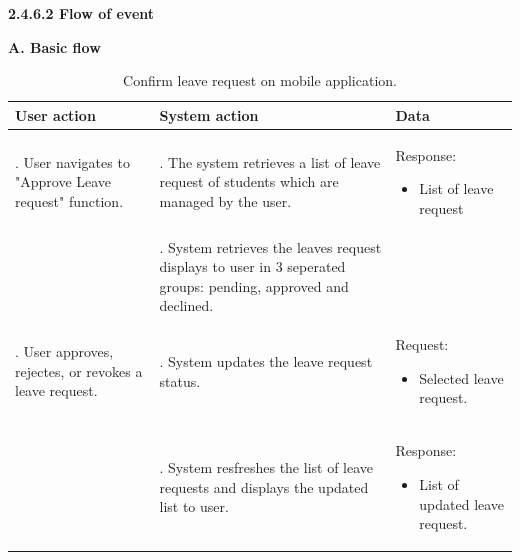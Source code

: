 \vspace{0.5em}
\indent\textbf{2.4.6.2 Flow of event}
\vspace{0.5em}
\par\indent\indent\textbf{A. Basic flow}
\vspace{-0.5em}
\renewcommand{\arraystretch}{1.5}
\begin{longtable}{|>{\raggedright\arraybackslash}p{4.5cm}|
                  >{\raggedright\arraybackslash}p{6cm}|
                  >{\raggedright\arraybackslash}p{4.5cm}|}                  
\caption{Confirm leave request on mobile application.}
\label{tab:leave_request_management_confirm_request_on_mobile_basic_flow}\\
\hline
\centering\textbf{User action} & \centering\textbf{System action} & \centering\arraybackslash\textbf{Data} \\
\hline
\endfirsthead
\endhead

1. User navigates to "Approve Leave request" function. & 2. The system retrieves a list of leave request of students which are managed by the user.&
    \par{Response:
        \vspace{-0.8em}
        \begin{itemize}
            \item List of leave request
            \vspace{-1.5em}
        \end{itemize}
    } \\
\hline
&3. System retrieves the leaves request displays to user in 3 seperated groups: pending, approved and declined.& \\
\hline
4. User approves, rejectes, or revokes a leave request.&5. System updates the leave request status.&
\par{Request: 
        \vspace{-0.8em}
        \begin{itemize}
            \item Selected leave request.
            \vspace{-1.2em}
        \end{itemize}
    }\\
\hline
&6. System resfreshes the list of leave requests and displays the updated list to user.&
\par{Response: 
        \vspace{-0.8em}
        \begin{itemize}
            \item List of updated leave request.
            \vspace{-1.2em}
        \end{itemize}
    }\\
\hline
\end{longtable}

